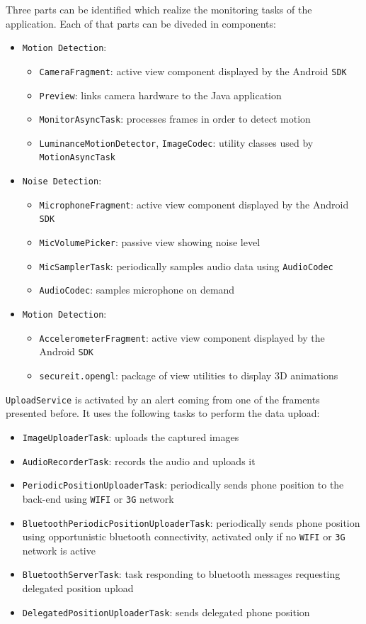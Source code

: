 \documentclass[conference, 11pt]{IEEEtran}
\begin{document}
Three parts can be identified which realize the monitoring tasks of the application. Each of that parts can be diveded in components:
\begin{itemize}
	\item \texttt{Motion Detection}:
		\begin{itemize}
			\item \texttt{CameraFragment}: active view component displayed by the Android \texttt{SDK}
			\item \texttt{Preview}: links camera hardware to the Java application
			\item \texttt{MonitorAsyncTask}: processes frames in order to detect motion
			\item \texttt{LuminanceMotionDetector}, \texttt{ImageCodec}: utility classes used by \texttt{MotionAsyncTask}
		\end{itemize}
	\item \texttt{Noise Detection}:
		\begin{itemize}
			\item \texttt{MicrophoneFragment}: active view component displayed by the Android \texttt{SDK}
			\item \texttt{MicVolumePicker}: passive view showing noise level
			\item \texttt{MicSamplerTask}: periodically samples audio data using \texttt{AudioCodec}
			\item \texttt{AudioCodec}: samples microphone on demand
		\end{itemize}
	\item \texttt{Motion Detection}:
		\begin{itemize}
			\item \texttt{AccelerometerFragment}: active view component displayed by the Android \texttt{SDK}
			\item \texttt{secureit.opengl}: package of view utilities to display 3D animations
		\end{itemize}
\end{itemize}

\texttt{UploadService} is activated by an alert coming from one of the framents presented before. It uses the following tasks to perform the data upload:
\begin{itemize}
	\item \texttt{ImageUploaderTask}: uploads the captured images
	\item \texttt{AudioRecorderTask}: records the audio and uploads it
	\item \texttt{PeriodicPositionUploaderTask}: periodically sends phone position to the back-end using \texttt{WIFI} or \texttt{3G} network
	\item \texttt{Bluetooth\allowbreak Periodic\allowbreak Position\allowbreak Uploader\allowbreak Task}: periodically sends phone position using opportunistic bluetooth connectivity, activated only if no \texttt{WIFI} or \texttt{3G} network is active
	\item \texttt{BluetoothServerTask}: task responding to bluetooth messages requesting delegated position upload
	\item \texttt{DelegatedPositionUploaderTask}: sends delegated phone position
\end{itemize}
\end{document}

